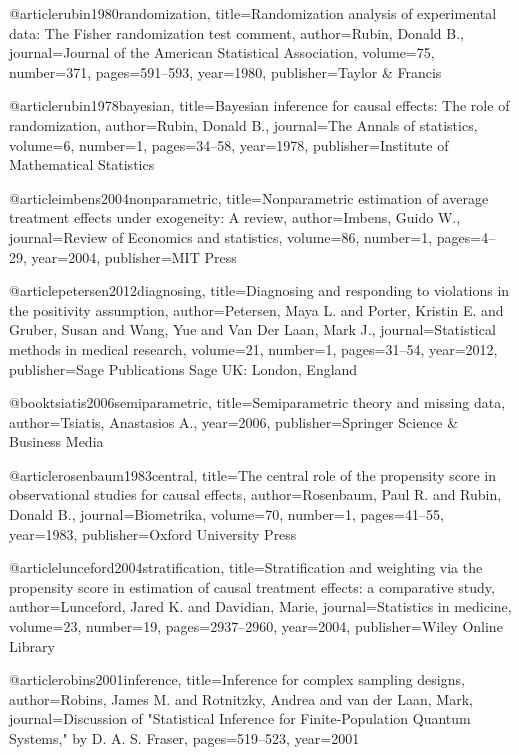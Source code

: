 @article{rubin1980randomization,
  title={Randomization analysis of experimental data: The Fisher randomization test comment},
  author={Rubin, Donald B.},
  journal={Journal of the American Statistical Association},
  volume={75},
  number={371},
  pages={591--593},
  year={1980},
  publisher={Taylor \& Francis}
}

@article{rubin1978bayesian,
  title={Bayesian inference for causal effects: The role of randomization},
  author={Rubin, Donald B.},
  journal={The Annals of statistics},
  volume={6},
  number={1},
  pages={34--58},
  year={1978},
  publisher={Institute of Mathematical Statistics}
}

@article{imbens2004nonparametric,
  title={Nonparametric estimation of average treatment effects under exogeneity: A review},
  author={Imbens, Guido W.},
  journal={Review of Economics and statistics},
  volume={86},
  number={1},
  pages={4--29},
  year={2004},
  publisher={MIT Press}
}

@article{petersen2012diagnosing,
  title={Diagnosing and responding to violations in the positivity assumption},
  author={Petersen, Maya L. and Porter, Kristin E. and Gruber, Susan and Wang, Yue and Van Der Laan, Mark J.},
  journal={Statistical methods in medical research},
  volume={21},
  number={1},
  pages={31--54},
  year={2012},
  publisher={Sage Publications Sage UK: London, England}
}

@book{tsiatis2006semiparametric,
  title={Semiparametric theory and missing data},
  author={Tsiatis, Anastasios A.},
  year={2006},
  publisher={Springer Science \& Business Media}
}


@article{rosenbaum1983central,
  title={The central role of the propensity score in observational studies for causal effects},
  author={Rosenbaum, Paul R. and Rubin, Donald B.},
  journal={Biometrika},
  volume={70},
  number={1},
  pages={41--55},
  year={1983},
  publisher={Oxford University Press}
}

@article{lunceford2004stratification,
  title={Stratification and weighting via the propensity score in estimation of causal treatment effects: a comparative study},
  author={Lunceford, Jared K. and Davidian, Marie},
  journal={Statistics in medicine},
  volume={23},
  number={19},
  pages={2937--2960},
  year={2004},
  publisher={Wiley Online Library}
}

@article{robins2001inference,
  title={Inference for complex sampling designs},
  author={Robins, James M. and Rotnitzky, Andrea and van der Laan, Mark},
  journal={Discussion of "Statistical Inference for Finite-Population Quantum Systems," by D. A. S. Fraser},
  pages={519--523},
  year={2001}
}

